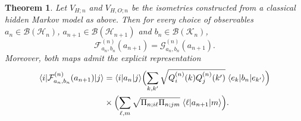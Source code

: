 \documentclass[11pt, reco]{article}
\newtheorem{theorem}{Theorem}[section]
\begin{document}
\begin{theorem}\label{thm:main}
Let $V_{H;n}$ and $V_{H,O;n}$ be the isometries constructed from a classical hidden Markov model as above.
Then for every choice of observables $a_n\in\mathcal{B}(\mathcal{H}_n)$, $a_{n+1}\in\mathcal{B}(\mathcal{H}_{n+1})$ and $b_n\in\mathcal{B}(\mathcal{K}_n)$,
\[
\mathcal{F}_{a_n,b_n}^{(n)}(a_{n+1}) = \mathcal{G}_{a_n,b_n}^{(n)}(a_{n+1}).
\]
Moreover, both maps admit the explicit representation
\begin{align}\label{eq:explicit}
\langle i|\mathcal{F}_{a_n,b_n}^{(n)}(a_{n+1})|j\rangle
&= \langle i|a_n|j\rangle
\Bigl(\sum_{k,k'}\sqrt{Q^{(n)}_i(k)Q^{(n)}_j(k')}\;\langle e_k|b_n|e_{k'}\rangle\Bigr) \\
&\times \Bigl(\sum_{\ell,m}\sqrt{\Pi_{n;i\ell}\Pi_{n;jm}}\;\langle\ell|a_{n+1}|m\rangle\Bigr).
\end{align}
\end{theorem}
\end{document}
